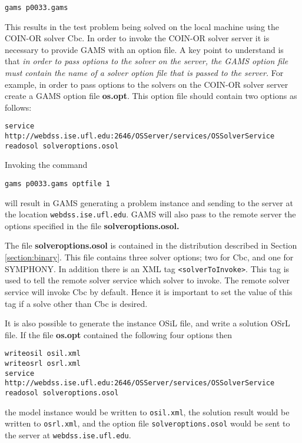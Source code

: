\documentclass[11pt]{article}
\renewcommand{\{}{{\char"7B}}
\renewcommand{\}}{{\char"7D}}
\renewcommand{\^}{{\char"0D}}
\renewcommand{\'}{{\char"0D}}
\begin{document}
\begin{verbatim}
gams p0033.gams
\end{verbatim}

This results in the test problem being solved on the local machine using the COIN-OR solver Cbc.  In order to invoke the COIN-OR solver server it is necessary to provide GAMS with an option file.  A key point to understand is that {\it in order to pass options to the solver on the server, the GAMS option file must contain the name of a solver option file that is passed to the server.}  For example, in order to pass options to the solvers on the COIN-OR solver server create a GAMS option file {\bf os.opt}. This option file should contain two options as follows:

\begin{verbatim}
service http://webdss.ise.ufl.edu:2646/OSServer/services/OSSolverService
readosol solveroptions.osol
\end{verbatim}

Invoking the command

\begin{verbatim}
gams p0033.gams optfile 1
\end{verbatim}
will result in GAMS generating a problem instance and sending to the server at the location {\tt webdss.ise.ufl.edu}.  GAMS will also pass to the remote server the options specified in the file {\bf  solveroptions.osol.}

The file {\bf solveroptions.osol} is contained in the distribution described in Section \ref{section:binary}. This file contains three solver options; two for Cbc, and one for SYMPHONY.  In addition there is an XML tag {\tt <solverToInvoke>}. This tag is used to tell the remote solver service which solver to invoke. The remote solver service will invoke Cbc by default. Hence it is important to set the value of this tag if a solve other than Cbc is desired. 

It is also possible to  generate the instance OSiL file, and write a solution  OSrL file. If the file {\bf os.opt} contained the following four options then
\begin{verbatim}
writeosil osil.xml
writeosrl osrl.xml
service http://webdss.ise.ufl.edu:2646/OSServer/services/OSSolverService
readosol solveroptions.osol
\end{verbatim}
the model instance would be written to {\tt osil.xml}, the solution result would be written to {\tt osrl.xml},  and the option file {\tt  solveroptions.osol} would be sent to the server at {\tt webdss.ise.ufl.edu}.
\end{document}
